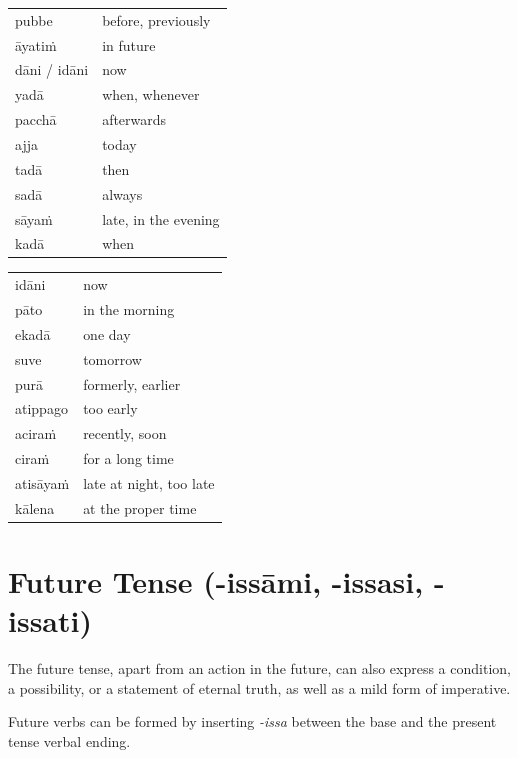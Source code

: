 \documentclass[11pt,oneside]{memoir}
\begin{document}
\begin{multicols}{2}

\begin{center}
\begin{tabular}{ll}
pubbe & before, previously\\
āyatiṁ & in future\\
dāni / idāni & now\\
yadā & when, whenever\\
pacchā & afterwards\\
ajja & today\\
tadā & then\\
sadā & always\\
sāyaṁ & late, in the evening\\
kadā & when\\
\end{tabular}
\end{center}

\columnbreak

\begin{center}
\begin{tabular}{ll}
idāni & now\\
pāto & in the morning\\
ekadā & one day\\
suve & tomorrow\\
purā & formerly, earlier\\
atippago & too early\\
aciraṁ & recently, soon\\
ciraṁ & for a long time\\
atisāyaṁ & late at night, too late\\
kālena & at the proper time\\
\end{tabular}
\end{center}

\end{multicols}
\section{Future Tense (-issāmi, -issasi, -issati)}
\label{sec:org6760323}

The future tense, apart from an action in the future, can also express a
condition, a possibility, or a statement of eternal truth, as well as a mild
form of imperative.

Future verbs can be formed by inserting \emph{-issa} between the base and the
present tense verbal ending.
\end{document}
